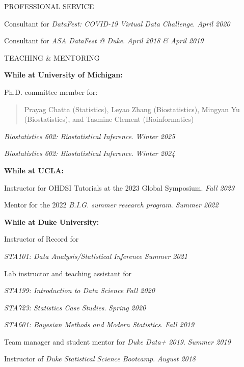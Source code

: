 \documentclass{resume} %
\newcommand{\thisYear}[1]{
	#1
}
\begin{document}
\begin{rSection}{PROFESSIONAL SERVICE}
\smallskip

Consultant for \emph{DataFest: COVID-19 Virtual Data Challenge}.  \hfill {\em April 2020}



\smallskip

Consultant for \emph{ASA DataFest @ Duke}. \hfill {\em April 2018 \& April 2019}
\end{rSection}

\begin{rSection}{TEACHING \& MENTORING}
	
\hspace*{-0.2in}\textbf{While at University of Michigan:}

Ph.D.  committee member for: 

\begin{quote}
	Prayag Chatta (Statistics), Leyao Zhang (Biostatistics),  Mingyan Yu (Biostatistics), and Tasmine Clement (Bioinformatics)
\end{quote}
	
    \emph{Biostatistics 602: Biostatistical Inference}.  \hfill {\em Winter 2025}

 \emph{Biostatistics 602: Biostatistical Inference}.  \hfill {\em Winter 2024}

\smallskip 

\hspace*{-0.2in}\textbf{While at UCLA:}
	
	Instructor for OHDSI Tutorials at the 2023 Global Symposium.  \hfill {\em Fall 2023}
		
	Mentor for the 2022 \emph{B.I.G. summer research program}.  \hfill {\em Summer 2022}
	
\smallskip 
	
\hspace*{-0.2in}\textbf{While at Duke University:}
	
	Instructor of Record for 
	
	
	\emph{STA101: Data Analysis/Statistical Inference} \hfill {\em Summer 2021}
	
	Lab instructor and teaching assistant for 
	
	\hspace{0.2in} \emph{STA199: Introduction to Data Science} \hfill {\em Fall 2020}
	
	\hspace{0.2in} \emph{STA723: Statistics Case Studies}. \hfill {\em Spring 2020}
	
	\hspace{0.2in} \emph{STA601: Bayesian Methods and Modern Statistics}. \hfill {\em Fall 2019}
	
	
	Team manager and student mentor for \emph{Duke Data+ 2019}. \hfill {\em Summer 2019}
	
	Instructor of \emph{Duke Statistical Science Bootcamp}. \hfill {\em August 2018}
\end{rSection}
\end{document}

